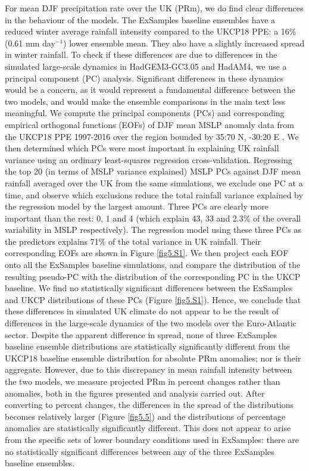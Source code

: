     For mean DJF precipitation rate over the UK (PRm), we do find clear differences in the behaviour of the models. The ExSamples baseline ensembles have a reduced winter average rainfall intensity compared to the UKCP18 PPE: a 16\% (0.61 mm day$^{-1}$) lower ensemble mean. They also have a slightly increased spread in winter rainfall. To check if these differences are due to differences in the simulated large-scale dynamics in HadGEM3-GC3.05 and HadAM4, we use a principal component (PC) analysis. Significant differences in these dynamics would be a concern, as it would represent a fundamental difference between the two models, and would make the ensemble comparisons in the main text less meaningful. We compute the principal components (PCs) and corresponding empirical orthogonal functions (EOFs) of DJF mean MSLP anomaly data from the UKCP18 PPE 1997-2016 over the region bounded by 35:70 N, -30:20 E \citep{neal_flexible_2016}. We then determined which PCs were most important in explaining UK rainfall variance using an ordinary least-squares regression cross-validation. Regressing the top 20 (in terms of MSLP variance explained) MSLP PCs against DJF mean rainfall averaged over the UK from the same simulations, we exclude one PC at a time, and observe which exclusions reduce the total rainfall variance explained by the regression model by the largest amount. Three PCs are clearly more important than the rest: 0, 1 and 4 (which explain 43, 33 and 2.3\% of the overall variability in MSLP respectively). The regression model using these three PCs as the predictors explains 71\% of the total variance in UK rainfall. Their corresponding EOFs are shown in Figure \ref{fig5.S1}. We then project each EOF onto all the ExSamples baseline simulations, and compare the distribution of the resulting pseudo-PC with the distribution of the corresponding PC in the UKCP baseline. We find no statistically significant differences between the ExSamples and UKCP distributions of these PCs (Figure \ref{fig5.S1}). Hence, we conclude that these differences in simulated UK climate do not appear to be the result of differences in the large-scale dynamics of the two models over the Euro-Atlantic sector. Despite the apparent difference in spread, none of three ExSamples baseline ensemble distributions are statistically significantly different from the UKCP18 baseline ensemble distribution for absolute PRm anomalies; nor is their aggregate. However, due to this discrepancy in mean rainfall intensity between the two models, we measure projected PRm in percent changes rather than anomalies, both in the figures presented and analysis carried out. After converting to percent changes, the differences in the spread of the distributions becomes relatively larger (Figure \ref{fig5.5}) and the distributions of percentage anomalies are statistically significantly different. This does not appear to arise from the specific sets of lower boundary conditions used in ExSamples: there are no statistically significant differences between any of the three ExSamples baseline ensembles.
     
